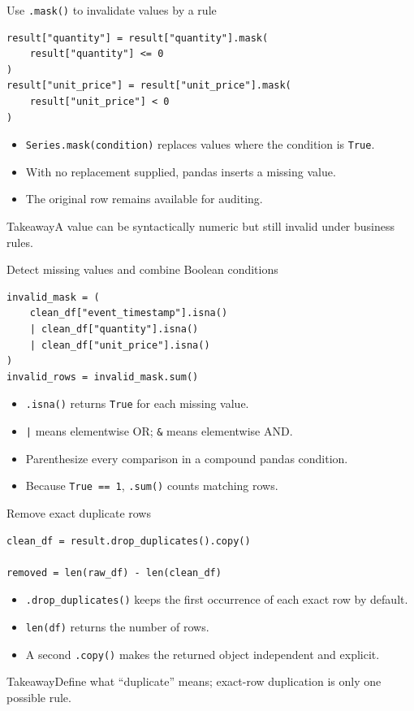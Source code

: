 \documentclass[11pt,aspectratio=43]{beamer}
\newcommand{\code}[1]{\texttt{#1}}
\newcommand{\takeaway}[1]{%
  \par\vspace{0.4em}
  \begin{block}{Takeaway}#1\end{block}}
\begin{document}
\begin{frame}[fragile]{Use \texttt{.mask()} to invalidate values by a rule}
\begin{lstlisting}
result["quantity"] = result["quantity"].mask(
    result["quantity"] <= 0
)
result["unit_price"] = result["unit_price"].mask(
    result["unit_price"] < 0
)
\end{lstlisting}
\begin{itemize}
  \item \code{Series.mask(condition)} replaces values where the condition is \code{True}.
  \item With no replacement supplied, pandas inserts a missing value.
  \item The original row remains available for auditing.
\end{itemize}
\takeaway{A value can be syntactically numeric but still invalid under business rules.}
\end{frame}

\begin{frame}[fragile]{Detect missing values and combine Boolean conditions}
\begin{lstlisting}
invalid_mask = (
    clean_df["event_timestamp"].isna()
    | clean_df["quantity"].isna()
    | clean_df["unit_price"].isna()
)
invalid_rows = invalid_mask.sum()
\end{lstlisting}
\begin{itemize}
  \item \code{.isna()} returns \code{True} for each missing value.
  \item \code{|} means elementwise OR; \code{\&} means elementwise AND.
  \item Parenthesize every comparison in a compound pandas condition.
  \item Because \code{True == 1}, \code{.sum()} counts matching rows.
\end{itemize}
\end{frame}

\begin{frame}[fragile]{Remove exact duplicate rows}
\begin{lstlisting}
clean_df = result.drop_duplicates().copy()

removed = len(raw_df) - len(clean_df)
\end{lstlisting}
\begin{itemize}
  \item \code{.drop\_duplicates()} keeps the first occurrence of each exact row by default.
  \item \code{len(df)} returns the number of rows.
  \item A second \code{.copy()} makes the returned object independent and explicit.
\end{itemize}
\takeaway{Define what ``duplicate'' means; exact-row duplication is only one possible rule.}
\end{frame}
\end{document}
